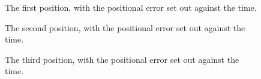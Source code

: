 \documentclass[a4paper]{article}
\begin{document}
\begin{figure}[htbp]
  \centering
  \caption{The first position, with the positional error set out against
         the time.}
  \label{fig:ik_plot1}
\end{figure}

\begin{figure}[htbp]
  \centering
  \caption{The second position, with the positional error set out against
         the time.}
  \label{fig:ik_plot2}
\end{figure}

\begin{figure}[htbp]
  \centering
  \caption{The third position, with the positional error set out against
         the time.}
  \label{fig:ik_plot3}
\end{figure}
\FloatBarrier
\end{document}
